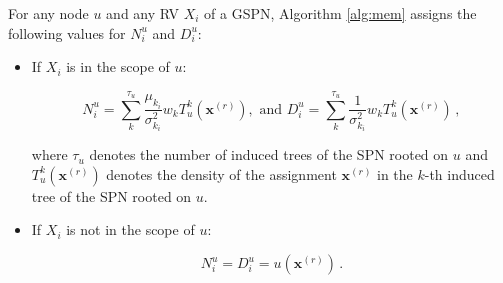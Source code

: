 \begin{lemma}
  \label{lem:alg_computation}
  For any node $u$ and any RV $X_i$ of a GSPN, Algorithm \ref{alg:mem} assigns the following values for $N^u_i$ and $D^u_i$:

  \begin{itemize}
    \item If $X_i$ is in the scope of $u$:

          \begin{equation}
            N^u_i = \sum_k^{\tau_u} \frac{\mu_{k_i}}{\sigma_{k_i}^2} w_k T_u^k\left(\mathbf{x}^{(r)}\right), \text{ and }
            D^u_i = \sum_k^{\tau_u} \frac{1}{\sigma_{k_i}^2} w_k T_u^k\left(\mathbf{x}^{(r)}\right) \, ,
          \end{equation}

          \noindent where $\tau_u$ denotes the number of induced trees of the SPN rooted on $u$ and $T_u^k(\mathbf{x}^{(r)})$ denotes the density of the assignment $\mathbf{x}^{(r)}$ in the $k$-th induced tree of the SPN rooted on $u$.

    \item If $X_i$ is not in the scope of $u$:

          \begin{equation}
            N^u_i = D^u_i = u\left(\mathbf{x}^{(r)}\right) \, .
          \end{equation}
  \end{itemize}
\end{lemma}

